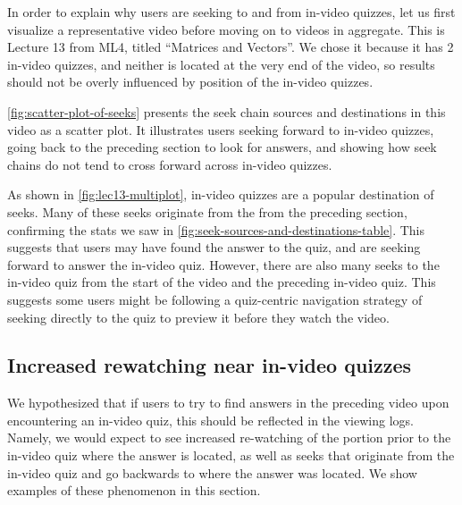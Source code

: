 \documentclass{sigchi}
\begin{document}
In order to explain why users are seeking to and from in-video quizzes, let us first visualize a representative video before moving on to videos in aggregate. This is Lecture 13 from ML4, titled ``Matrices and Vectors''. We chose it because it has 2 in-video quizzes, and neither is located at the very end of the video, so results should not be overly influenced by position of the in-video quizzes.

\autoref{fig:scatter-plot-of-seeks} presents the seek chain sources and destinations in this video as a scatter plot. It illustrates users seeking forward to in-video quizzes, going back to the preceding section to look for answers, and showing how seek chains do not tend to cross forward across in-video quizzes.

As shown in \autoref{fig:lec13-multiplot}, in-video quizzes are a popular destination of seeks. Many of these seeks originate from the from the preceding section, confirming the stats we saw in \autoref{fig:seek-sources-and-destinations-table}. This suggests that users may have found the answer to the quiz, and are seeking forward to answer the in-video quiz. However, there are also many seeks to the in-video quiz from the start of the video and the preceding in-video quiz. This suggests some users might be following a quiz-centric navigation strategy of seeking directly to the quiz to preview it before they watch the video.


\subsection{Increased rewatching near in-video quizzes}

We hypothesized that if users to try to find answers in the preceding video upon encountering an in-video quiz, this should be reflected in the viewing logs. Namely, we would expect to see increased re-watching of the portion prior to the in-video quiz where the answer is located, as well as seeks that originate from the in-video quiz and go backwards to where the answer was located. We show examples of these phenomenon in this section.
\end{document}
